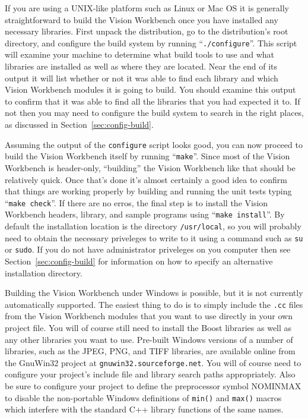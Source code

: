If you are using a UNIX-like platform such as Linux or Mac OS it is
generally straightforward to build the Vision Workbench once you have
installed any necessary libraries.  First unpack the distribution, go
to the distribution's root directory, and configure the build system
by running ``\verb#./configure#''.  This script will examine your machine
to determine what build tools to use and what libraries are installed
as well as where they are located.  Near the end of its output it will
list whether or not it was able to find each library and which Vision
Workbench modules it is going to build.  You should examine this
output to confirm that it was able to find all the libraries that you
had expected it to.  If not then you may need to configure the build
system to search in the right places, as discussed in
Section~\ref{sec:config-build}.

Assuming the output of the \verb#configure# script looks good, you can
now proceed to build the Vision Workbench itself by running 
``\verb#make#''.  Since most of the Vision Workbench is header-only,
``building'' the Vision Workbench like that should be relatively
quick.  Once that's done it's almost certainly a good idea to confirm
that things are working properly by building and running the unit
tests typing ``\verb#make check#''.  If there are no erros, the final
step is to install the Vision Workbench headers, library, and sample
programs using ``\verb#make install#''.  By default the installation
location is the directory \verb#/usr/local#, so you will probably need
to obtain the necessary priveleges to write to it using a command such
as \verb#su# or \verb#sudo#.  If you do not have administrator
priveleges on you computer then see Section~\ref{sec:config-build} for 
information on how to specify an alternative installation directory.

Building the Vision Workbench under Windows is possible, but it is not
currently automatically supported.  The easiest thing to do is to
simply include the \verb#.cc# files from the Vision Workbench modules
that you want to use directly in your own project file.  You will of
course still need to install the Boost libraries as well as any other
libraries you want to use.  Pre-built Windows versions of a number of
libraries, such as the JPEG, PNG, and TIFF libraries, are available
online from the GnuWin32 project at \verb#gnuwin32.sourceforge.net#.  
You will of course need to configure your project's include file and 
library search paths appropriately.  Also be sure to configure your 
project to define the preprocessor symbol NOMINMAX to disable the 
non-portable Windows definitions of \verb#min()# and \verb#max()# 
macros which interfere with the standard C++ library functions of 
the same names.

